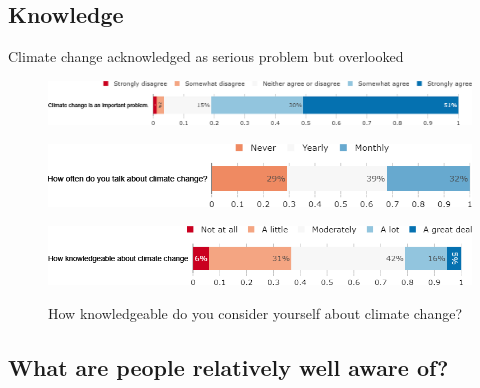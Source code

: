 \begin{framefont}{\small}


\section{Knowledge}

\begin{frame}{Climate change acknowledged as serious problem but overlooked}%
	\begin{figure}[h!]
	\centering
	\caption{Do you agree or disagree with the following statement: ``Climate change is an important problem."}
	\includegraphics[width=.78\paperwidth]{../figures/FR/CC_problem_FR.png}
	\caption{How often do you think or talk with people about climate change?}
	\includegraphics[width=.61\paperwidth]{../figures/FR/CC_talks_FR.png}\\
	\centering
	\caption{How knowledgeable do you consider yourself about climate change?}
	\includegraphics[width=.7\paperwidth]{../figures/FR/CC_knowledgeable_FR.png}
	\\
	\end{figure}
\end{frame}

\subsection{What are people relatively well aware of?}


\end{framefont}
